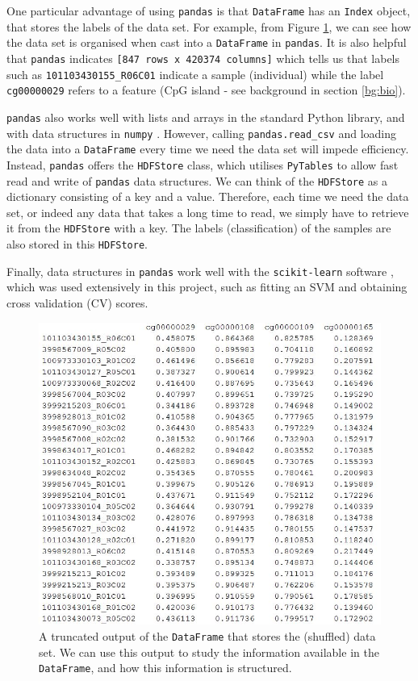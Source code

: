 \documentclass[12pt, twoside, a4paper]{report}
\begin{document}
One particular advantage of using \texttt{pandas} is that \texttt{DataFrame} has an \texttt{Index} object, that stores the labels of the data set. For example, from Figure \ref{data:pandas:example}, we can see how the data set is organised when cast into a \texttt{DataFrame} in \texttt{pandas}. It is also helpful that \texttt{pandas} indicates \texttt{[847 rows x 420374 columns]} which tells us that labels such as \texttt{101103430155\_R06C01} indicate a sample (individual) while the label \texttt{cg00000029} refers to a feature (CpG island - see background in section \ref{bg:bio}).

\texttt{pandas} also works well with lists and arrays in the standard Python library, and with data structures in \texttt{numpy} \cite{RefWorks:214}. However, calling \texttt{pandas.read\_csv} and loading the data into a \texttt{DataFrame} every time we need the data set will impede efficiency. Instead, \texttt{pandas} offers the \texttt{HDFStore} class, which utilises \texttt{PyTables} \cite{pytables} to allow fast read and write of \texttt{pandas} data structures. We can think of the \texttt{HDFStore} as a dictionary consisting of a key and a value. Therefore, each time we need the data set, or indeed any data that takes a long time to read, we simply have to retrieve it from the \texttt{HDFStore} with a key. The labels (classification) of the samples are also stored in this \texttt{HDFStore}.

Finally, data structures in  \texttt{pandas} work well with the \texttt{scikit-learn} software \cite{scikit-learn}, which was used extensively in this project, such as fitting an SVM and obtaining cross validation (CV) scores.

\begin{figure}
\centering
\includegraphics[scale=0.9]{images/pandas-example.JPG}
\caption{A truncated output of the \texttt{DataFrame} that stores the (shuffled) data set. We can use this output to study the information available in the \texttt{DataFrame}, and how this information is structured.}
\label{data:pandas:example}
\end{figure}
\end{document}
